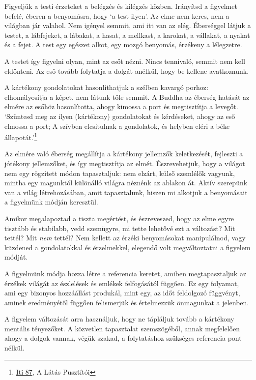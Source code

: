 Figyeljük a testi érzeteket a belégzés és kilégzés közben. Irányítsd a
figyelmet befelé, éberen a benyomásra, hogy `a test ilyen'. Az elme nem
keres, nem a világban jár valahol. Nem igényel semmit, ami itt van az
elég. Éberséggel látjuk a testet, a lábfejeket, a lábakat, a hasat, a
mellkast, a karokat, a vállakat, a nyakat és a fejet. A test egy egészet
alkot, egy mozgó benyomás, érzékeny a lélegzetre.

A testet így figyelni olyan, mint az esőt nézni. Nincs tennivaló, semmit
nem kell eldönteni. Az eső tovább folytatja a dolgát anélkül, hogy be
kellene avatkoznunk.


A kártékony gondolatokat hasonlíthatjuk a szélben kavargó porhoz:
elhomályosítja a képet, nem látunk tőle semmit. A Buddha az éberség
hatását az elmére az esőhöz hasonlította, ahogy kimossa a port és
megtisztítja a levegőt. `Szüntesd meg az ilyen (kártékony) gondolatokat
és kérdéseket, ahogy az eső elmossa a port; A szívben elcsitulnak a
gondolatok, és helyben eléri a béke állapotát.'\footnote{\href{https://suttacentral.net/iti87/en/sujato}{Iti
  87}, A Látás Pusztítói}

Az elmére való éberség megállítja a kártékony jellemzők keletkezését,
fejleszti a jótékony jellemzőket, és így megtisztítja az elmét.
Észrevehetjük, hogy a világot nem egy rögzített módon tapasztaljuk: nem
elzárt, külső szemlélők vagyunk, mintha egy magunktól különálló világra
néznénk az ablakon át. Aktív szerepünk van a világ létrehozásában, amit
tapasztalunk, hiszen mi alkotjuk a benyomásait a figyelmünk módján
keresztül.

Amikor megalapoztad a tiszta megértést, és észreveszed, hogy az elme
egyre tisztább és stabilabb, vedd szemügyre, mi tette lehetővé ezt a
változást? Mit tettél? Mit \emph{nem} tettél? Nem kellett az érzéki
benyomásokat manipulálnod, vagy küzdened a gondolatokkal és érzelmekkel,
elegendő volt megváltoztatni a figyelem módját.

A figyelmünk módja hozza létre a referencia keretet, amiben
megtapasztaljuk az érzékek világát az észlelések és emlékek felfogásától
függően. Ez egy folyamat, ami egy bizonyos hozzáállást produkál, mint
egy, az időt feldolgozó függvényt, aminek eredményétől függően
felismerjük és értelmezzük önmagunkat a jelenben.

A figyelem változását arra használjuk, hogy ne tápláljuk tovább a
kártékony mentális tényezőket. A közvetlen tapasztalat szemszögéből,
annak megfelelően ahogy a dolgok vannak, végük szakad, a folytatáshoz
szükséges referencia pont nélkül.

